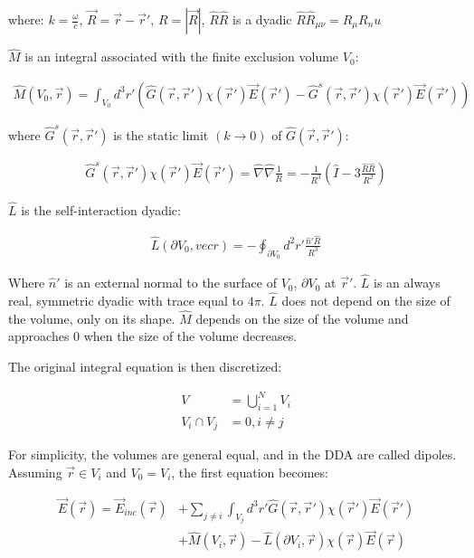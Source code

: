     where: $k = \frac{\omega}{c}$, $\vec{R} = \vec{r} - \vec{r}'$, $R = |\vec{R}|$, $\hat{R}\hat{R}$ is a dyadic $\hat{R}\hat{R}_{\mu\nu} = R_\mu R_nu$

    $\hat{M}$ is an integral associated with the finite exclusion volume $V_0$:

    \begin{align}
        \hat{M}(V_0, \vec{r}) = \int_{V_0}d^3r'\left(\hat{G}(\vec{r}, \vec{r}')\chi(\vec{r}')\vec{E}(\vec{r}')
                                - \hat{G}^s(\vec{r}, \vec{r}')\chi(\vec{r}')\vec{E}(\vec{r}')\right)
    \end{align}

    where $\hat{G}^s(\vec{r}, \vec{r}')$ is the static limit $(k \rightarrow 0)$ of $\hat{G}(\vec{r}, \vec{r}')$:

    \begin{align}
        \hat{G}^s(\vec{r}, \vec{r}')\chi(\vec{r}')\vec{E}(\vec{r}') = \hat{\nabla}\hat{\nabla}\frac{1}{R}
                                            = -\frac{1}{R^3}\left(\hat{I}-3\frac{\hat{R}\hat{R}}{R^2}\right)
    \end{align}

    $\hat{L}$ is the self-interaction dyadic:

    \begin{align}
        \hat{L}(\partial V_0, vec{r}) = -\oint_{\partial V_0} d^2 r' \frac{\hat{n}'\hat{R}}{R^3}
    \end{align}

    Where $\hat{n}'$ is an external normal to the surface of $V_0$, $\partial V_0$ at $\vec{r}'$. $\hat{L}$ is an always real, symmetric dyadic
    with trace equal to $4\pi$. $\hat{L}$ does not depend on the size of the volume, only on its shape. $\hat{M}$ depends on the size of the
    volume and approaches $0$ when the size of the volume decreases.

    The original integral equation is then discretized:

    \begin{align}
        V &= \bigcup^N_{i=1}V_i \\
        V_i \cap V_j &= 0, i \neq j
    \end{align}

    For simplicity, the volumes are general equal, and in the DDA are called dipoles. Assuming $\vec{r} \in V_i$ and $V_0 = V_i$, the first
    equation becomes:

    \begin{align}
        \vec{E}(\vec{r}) = \vec{E}_{inc}(\vec{r}) &+ \sum_{j\neq i} \int_{V_j} d^3 r'\hat{G}(\vec{r}, \vec{r}')\chi(\vec{r}')\vec{E}(\vec{r}') \nonumber\\
                                                &+ \hat{M}(V_i, \vec{r}) - \hat{L}(\partial V_i, \vec{r})\chi(\vec{r})\vec{E}(\vec{r})
    \end{align}

